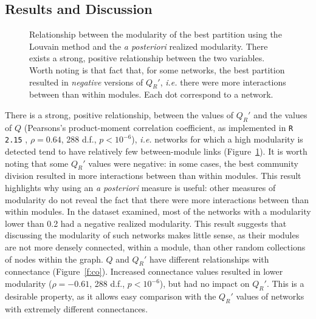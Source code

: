 \documentclass[12pt,oneside]{article}
\begin{document}
\subsection{Results and Discussion}

\begin{figure}[tbp]
\begin{center}
\end{center}
\caption{Relationship between the modularity of the best partition using the Louvain method and the \emph{a posteriori} realized modularity. There exists a strong, positive relationship between the two variables. Worth noting is that fact that, for some networks, the best partition resulted in \emph{negative} versions of $Q_R'$, \emph{i.e.} there were more interactions between than within modules. Each dot correspond to a network.}
\label{f:qqr}
\end{figure}

There is a strong, positive relationship, between the values of $Q_R'$ and
the values of $Q$ (Pearsons's product-moment correlation coefficient, as
implemented in \texttt{R 2.15} \cite{team_r:_2008}, $\rho = 0.64$, 288 d.f.,
$p < 10^{-6}$), \emph{i.e.} networks for which a high modularity is detected
tend to have relatively few between-module links (Figure~\ref{f:qqr}). It
is worth noting that some $Q_R'$ values were negative: in some cases, the
best community division resulted in more interactions between than within
modules. This result highlights why using an \emph{a posteriori} measure is
useful: other measures of modularity do not reveal the fact that there were
more interactions between than within modules. In the dataset examined,
most of the networks with a modularity lower than 0.2 had a negative
realized modularity. This result suggests that discussing the modularity
of such networks makes little sense, as their modules are not more densely
connected, within a module, than other random collections of nodes within
the graph. $Q$ and $Q_R'$ have different relationships with connectance
(Figure~\ref{f:co}). Increased connectance values resulted in lower modularity
($\rho = -0.61$, 288 d.f., $p < 10^{-6}$), but had no impact on $Q_R'$. This
is a desirable property, as it allows easy comparison with the $Q_R'$ values
of networks with extremely different connectances.
\end{document}
